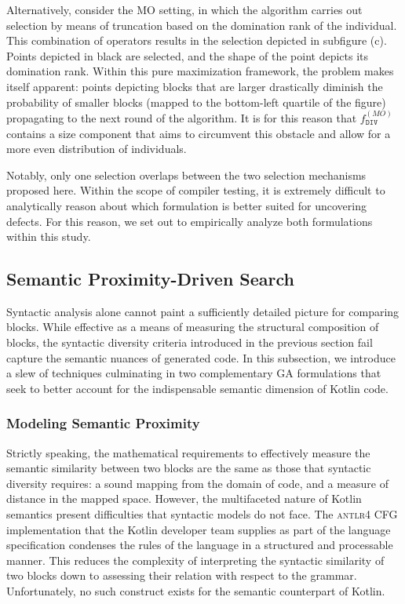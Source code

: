 Alternatively, consider the \gls{MO} setting, in which
the algorithm carries out selection by means
of truncation based on the domination rank of the individual.
This combination of operators results in the selection depicted
in subfigure (c).
Points depicted in black are selected, and the shape of the point
depicts its domination rank.
Within this pure maximization framework, the problem makes itself apparent:
points depicting blocks that are larger drastically diminish the probability
of smaller blocks (mapped to the bottom-left quartile of the figure) propagating
to the next round of the algorithm.
It is for this reason that $f^{(MO)}_{\texttt{DIV}}$ contains a size component
that aims to circumvent this obstacle and allow for a more even
distribution of individuals.

Notably, only one selection overlaps between
the two selection mechanisms proposed here.
Within the scope of compiler testing, it is extremely difficult
to analytically reason about which
formulation is better suited for uncovering defects.
For this reason, we set out to empirically analyze both
formulations within this study.

\subsection{\label{subsec:proximity-ga}Semantic Proximity-Driven Search}

Syntactic analysis alone cannot paint a sufficiently
detailed picture for comparing blocks.
While effective as a means of measuring the structural composition of
blocks, the syntactic diversity criteria introduced in the previous
section fail capture the semantic nuances of generated code.
In this subsection, we introduce a slew of techniques culminating in two
complementary \gls{GA} formulations that seek to better
account for the indispensable semantic dimension of Kotlin code. 

\subsubsection{Modeling Semantic Proximity}

Strictly speaking, the mathematical requirements to effectively
measure the semantic similarity between two blocks
are the same as those that syntactic diversity requires:
a sound mapping from the domain of code, and a measure of distance
in the mapped space.
However, the multifaceted nature of Kotlin semantics
present difficulties that syntactic models do not face.
The \textsc{antlr4} \gls{CFG} implementation that the Kotlin
developer team supplies as part of the language specification
condenses the rules of the language in a structured and processable
manner.
This reduces the complexity of interpreting the syntactic similarity
of two blocks down to assessing their relation with respect to the grammar.
Unfortunately, no such construct exists for the semantic counterpart of Kotlin.

